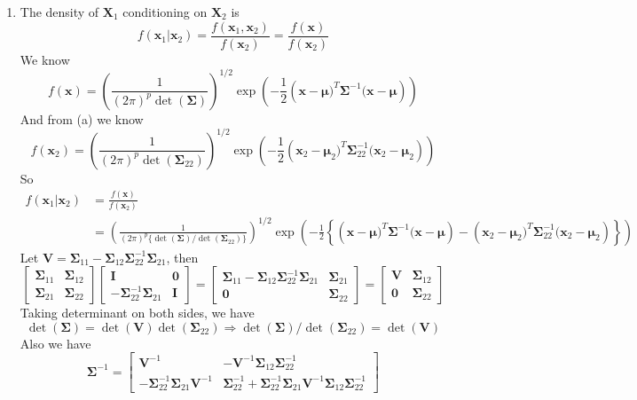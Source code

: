 \documentclass{article}
\begin{document}
\begin{enumerate}[leftmargin = 0 em, label = \arabic*., font = \bfseries]
\begin{enumerate}
	\item The density of $\bm X_1$ conditioning on $\bm X_2$ is
	\[f(\bm x_1 | \bm x_2) = \frac{f(\bm x_1, \bm x_2)}{f(\bm x_2)} = \frac{f(\bm x)}{f(\bm x_2)}\]
	We know 
	\[f(\bm x) = \left(\frac{1}{(2 \pi)^{p} \det (\bm \Sigma)}\right)^{1/2} \exp\left(-\frac{1}{2}\left(\bm x - \bm \mu)^{T} \bm \Sigma^{-1} (\bm x - \bm \mu\right)\right) \]
	And from (a) we know
	\[f(\bm x_2) = \left(\frac{1}{(2 \pi)^{p} \det (\bm \Sigma_{22})}\right)^{1/2} \exp\left(-\frac{1}{2}\left(\bm x_2 - \bm \mu_2)^{T} \bm \Sigma_{22}^{-1} (\bm x_2 - \bm \mu_2\right)\right) \]
	So
	\begin{align*}
	f(\bm x_1|\bm x_2) &= \frac{f(\bm x)}{f(\bm x_2)} \\
	& = \left(\frac{1}{(2 \pi)^{p} \{\det(\bm \Sigma)/\det (\bm \Sigma_{22})\}}\right)^{1/2} \exp\left(-\frac{1}{2}\left\{\left(\bm x - \bm \mu)^{T} \bm \Sigma^{-1} (\bm x - \bm \mu\right) - \left(\bm x_2 - \bm \mu_2)^{T} \bm \Sigma_{22}^{-1} (\bm x_2 - \bm \mu_2\right)\right\}\right)
	\end{align*}
	Let $\bm V = \bm \Sigma_{11} - \bm \Sigma_{12} \bm \Sigma_{22}^{-1} \bm \Sigma_{21}$, then
	\[\begin{bmatrix}
		\bm \Sigma_{11} & \bm \Sigma_{12}\\
		\bm \Sigma_{21} & \bm \Sigma_{22}
	\end{bmatrix} \begin{bmatrix}
		\bm I & \bm 0\\
		- \bm \Sigma_{22}^{-1} \bm \Sigma_{21} & \bm I
	\end{bmatrix} = \begin{bmatrix}
		\bm \Sigma_{11} - \bm \Sigma_{12} \bm \Sigma_{22}^{-1} \bm \Sigma_{21} & \bm \Sigma_{21}\\
		\bm 0 & \bm \Sigma_{22}
	\end{bmatrix} = \begin{bmatrix}
	\bm V & \bm \Sigma_{12}\\
	\bm 0 & \bm \Sigma_{22}
	\end{bmatrix}\]
	Taking determinant on both sides, we have
	\[\det(\bm \Sigma) = \det(\bm V) \det(\bm \Sigma_{22}) \Rightarrow \det(\bm \Sigma)/\det(\bm \Sigma_{22}) = \det(\bm V)\]
	Also we have
	\[\bm \Sigma^{-1} = \begin{bmatrix}
		\bm V^{-1} & - \bm V^{-1} \bm \Sigma_{12} \bm \Sigma_{22}^{-1}\\
		- \bm \Sigma_{22}^{-1} \bm \Sigma_{21} \bm V^{-1} & \bm \Sigma_{22}^{-1} + \bm \Sigma_{22}^{-1} \bm \Sigma_{21} \bm V^{-1} \bm \Sigma_{12} \bm \Sigma_{22}^{-1}

\end{bmatrix}\]
\end{enumerate}
\end{enumerate}
\end{document}
